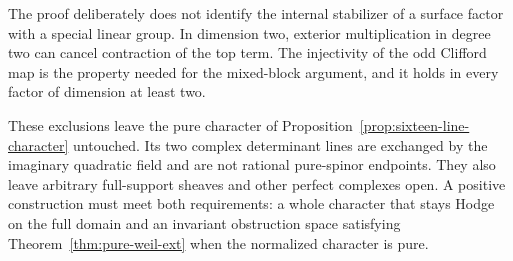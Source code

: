 The proof deliberately does not identify the internal stabilizer
of a surface factor with a special linear group. In dimension two,
exterior multiplication in degree two can cancel contraction of the
top term. The injectivity of the odd Clifford map is the property
needed for the mixed-block argument, and it holds in every factor
of dimension at least two.

These exclusions leave the pure character of Proposition~\ref{prop:sixteen-line-character} untouched. Its two complex determinant lines are exchanged by the imaginary quadratic field and are not rational pure-spinor endpoints. They also leave arbitrary full-support sheaves and other perfect complexes open. A positive construction must meet both requirements: a whole character that stays Hodge on the full domain and an invariant obstruction space satisfying Theorem~\ref{thm:pure-weil-ext} when the normalized character is pure.
